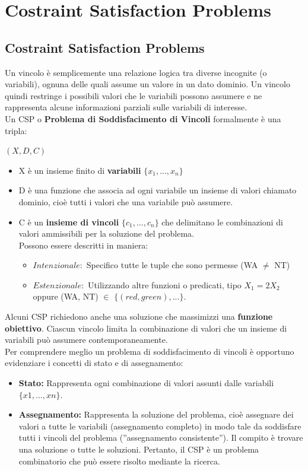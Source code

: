 \chapter{Costraint Satisfaction Problems} \label{ch:Costraint Satisfaction Problems}
\section{Costraint Satisfaction Problems}
Un vincolo è semplicemente una relazione logica tra diverse incognite (o variabili), ognuna delle quali assume un valore in un dato dominio. Un vincolo quindi restringe i possibili valori che le variabili possono assumere e ne rappresenta alcune informazioni parziali sulle variabili di interesse. 
\vspace{0.5cm}
\\Un CSP o \textbf{Problema di Soddisfacimento di Vincoli} formalmente è una tripla:
\begin{center}
    $(X, D, C)$
\end{center}
\begin{itemize}
    \item X è un insieme finito di \textbf{variabili} $\{x_1, ..., x_n\}$
    \item D è una funzione che associa ad ogni variabile un insieme di valori chiamato dominio, cioè tutti i valori che una variabile può assumere.
    \item C è un \textbf{insieme di vincoli}  $\{c_1, ..., c_n\}$ che delimitano le combinazioni di valori ammissibili per la soluzione del problema. 
    \\Possono essere descritti in maniera:
    \begin{itemize}
        \item $Intenzionale:$ Specifico tutte le tuple che sono permesse (WA $\neq$ NT)
        \item $Estenzionale:$ Utilizzando altre funzioni o predicati, tipo $X_1 = 2X_2$ oppure (WA, NT) $\in$ $\{(red, green), ...\}$.
    \end{itemize}
\end{itemize}
\noindent Alcuni CSP richiedono anche una soluzione che massimizzi una \textbf{funzione obiettivo}. Ciascun vincolo limita la combinazione di valori che un insieme di variabili può assumere contemporaneamente. \\
Per comprendere meglio un problema di soddisfacimento di vincoli è opportuno evidenziare i concetti di stato e di assegnamento:
\begin{itemize}
    \item \textbf{Stato:} Rappresenta ogni combinazione di valori assunti dalle variabili $\{x1,..., xn\}$.
    \item \textbf{Assegnamento:} Rappresenta la soluzione del problema, cioè assegnare dei valori a tutte le variabili (assegnamento completo) in modo tale da soddisfare tutti i vincoli del problema (”assegnamento consistente”). Il compito è trovare una soluzione o tutte le soluzioni. Pertanto, il CSP è un problema combinatorio che può essere risolto mediante la ricerca.
\end{itemize}
